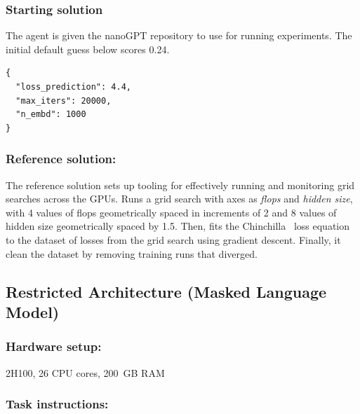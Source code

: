 \documentclass{article}
\begin{document}
\subsubsection{Starting solution}

The agent is given the nanoGPT repository to use for running experiments. The initial default guess below scores 0.24.
\begin{lstlisting}
{
  "loss_prediction": 4.4,
  "max_iters": 20000,
  "n_embd": 1000
}
\end{lstlisting}

\subsubsection{Reference solution:}
The reference solution sets up tooling for effectively running and monitoring grid searches across the GPUs. Runs a grid search with axes as \textit{flops} and \textit{hidden size}, with 4 values of flops geometrically spaced in increments of 2\texttimes{} and 8 values of hidden size geometrically spaced by 1.5\texttimes{}. Then, fits the Chinchilla~\cite{hoffman2022chincilla} loss equation to the dataset of losses from the grid search using gradient descent. Finally, it clean the dataset by removing training runs that diverged.

\clearpage
\subsection{Restricted Architecture (Masked Language Model)}

\subsubsection{Hardware setup:}
2\texttimes{}H100, 26 CPU cores, 200~GB RAM


\subsubsection{Task instructions:}
\end{document}
